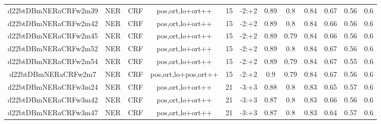 \documentclass[a4paper]{article}
\begin{document}
\begin{landscape}
\begin{center}
\begin{tabular}{ |c|c|c|c|c|c|c|c|c|c|c|c|}
 	
 
 	
 		
 		\small{ d22btDBmNERaCRFw2m39 } & NER & CRF & pos,ort,lo+ort++  &  15 &  -2:+2  &  0.89 & 0.8 & 0.84  &  0.67 & 0.56 & 0.6 \\
 		

 	
 
 	
 		
 		\small{ d22btDBmNERaCRFw2m42 } & NER & CRF & pos,ort,lo+ort++  &  15 &  -2:+2  &  0.89 & 0.8 & 0.84  &  0.66 & 0.56 & 0.6 \\
 		

 	
 
 	
 		
 		\small{ d22btDBmNERaCRFw2m45 } & NER & CRF & pos,ort,lo+ort++  &  15 &  -2:+2  &  0.89 & 0.79 & 0.84  &  0.66 & 0.56 & 0.6 \\
 		

 	
 
 	
 		
 		\small{ d22btDBmNERaCRFw2m52 } & NER & CRF & pos,ort,lo+ort++  &  15 &  -2:+2  &  0.89 & 0.8 & 0.84  &  0.67 & 0.56 & 0.6 \\
 		

 	
 
 	
 		
 		\small{ d22btDBmNERaCRFw2m54 } & NER & CRF & pos,ort,lo+ort++  &  15 &  -2:+2  &  0.89 & 0.79 & 0.84  &  0.67 & 0.55 & 0.6 \\
 		

 	
 
 	
 		
 		\small{ d22btDBmNERaCRFw2m7 } & NER & CRF & pos,ort,lo+pos,ort++  &  15 &  -2:+2  &  0.9 & 0.79 & 0.84  &  0.67 & 0.56 & 0.6 \\
 		

 	
 
 	
 		
 		\small{ d22btDBmNERaCRFw3m24 } & NER & CRF & pos,ort,lo+ort++  &  21 &  -3:+3  &  0.88 & 0.8 & 0.83  &  0.65 & 0.57 & 0.6 \\
 		

 	
 
 	
 		
 		\small{ d22btDBmNERaCRFw3m42 } & NER & CRF & pos,ort,lo+ort++  &  21 &  -3:+3  &  0.87 & 0.8 & 0.83  &  0.66 & 0.56 & 0.6 \\
 		

 	
 
 	
 		
 		\small{ d22btDBmNERaCRFw3m47 } & NER & CRF & pos,ort,lo+ort++  &  21 &  -3:+3  &  0.87 & 0.8 & 0.83  &  0.64 & 0.57 & 0.6 \\
 		


\end{tabular}
\end{center}
\end{landscape}
\end{document}
